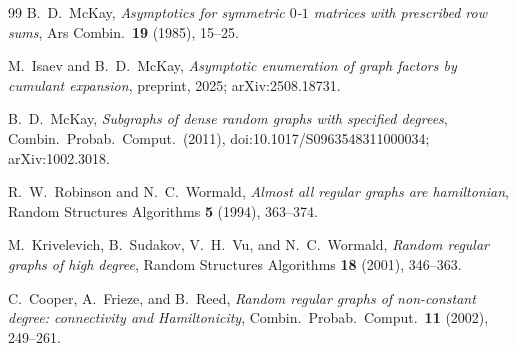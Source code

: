 \documentclass[11pt]{article}
\begin{document}
\begin{thebibliography}{99}
B.~D.~McKay,
\emph{Asymptotics for symmetric \(0\)-\(1\) matrices with prescribed row sums},
Ars Combin.\ \textbf{19} (1985), 15--25.

M.~Isaev and B.~D.~McKay,
\emph{Asymptotic enumeration of graph factors by cumulant expansion},
preprint, 2025; arXiv:2508.18731.

B.~D.~McKay,
\emph{Subgraphs of dense random graphs with specified degrees},
Combin.\ Probab.\ Comput.\ (2011), doi:10.1017/S0963548311000034;
arXiv:1002.3018.

R.~W.~Robinson and N.~C.~Wormald,
\emph{Almost all regular graphs are hamiltonian},
Random Structures Algorithms \textbf{5} (1994), 363--374.

M.~Krivelevich, B.~Sudakov, V.~H.~Vu, and N.~C.~Wormald,
\emph{Random regular graphs of high degree},
Random Structures Algorithms \textbf{18} (2001), 346--363.

C.~Cooper, A.~Frieze, and B.~Reed,
\emph{Random regular graphs of non-constant degree: connectivity and Hamiltonicity},
Combin.\ Probab.\ Comput.\ \textbf{11} (2002), 249--261.

\end{thebibliography}
\end{document}
